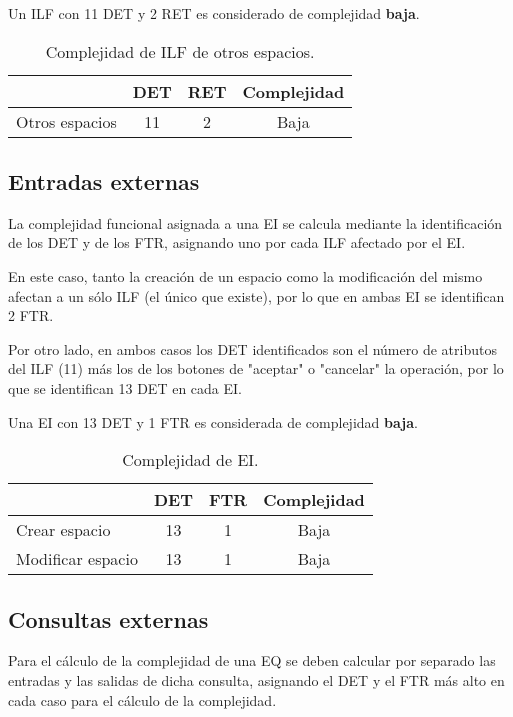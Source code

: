 \par Un ILF con 11 DET y 2 RET es considerado de complejidad \textbf{baja}.

\begin{table}[h]
\begin{center}
\begin{tabular}{ l c c c }
& \textbf{DET} & \textbf{RET} & \textbf{Complejidad} \\ \hline
Otros espacios & 11 & 2 & Baja\\ \hline
\end{tabular}
\caption{Complejidad de ILF de otros espacios.}
\label{tab:compILF}
\end{center}
\end{table}

\subsection{Entradas externas}
\par La complejidad funcional asignada a una EI se calcula mediante la identificación de los DET y de los FTR, asignando uno por cada ILF afectado por el EI.

\par En este caso, tanto la creación de un espacio como la modificación del mismo afectan a un sólo ILF (el único que existe), por lo que en ambas EI se identifican 2 FTR.

\par Por otro lado, en ambos casos los DET identificados son el número de atributos del ILF (11) más los de los botones de "aceptar" o "cancelar" la operación, por lo que se identifican 13 DET en cada EI.

\par Una EI con 13 DET y 1 FTR es considerada de complejidad \textbf{baja}.

\begin{table}[h]
\begin{center}
\begin{tabular}{ l c c c }
& \textbf{DET} & \textbf{FTR} & \textbf{Complejidad} \\ \hline
Crear espacio & 13 & 1 & Baja\\
Modificar espacio & 13 & 1 & Baja\\ \hline
\end{tabular}
\caption{Complejidad de EI.}
\label{tab:compEI}
\end{center}
\end{table}

\subsection{Consultas externas}
\par Para el cálculo de la complejidad de una EQ se deben calcular por separado las entradas y las salidas de dicha consulta, asignando el DET y el FTR más alto en cada caso para el cálculo de la complejidad.

